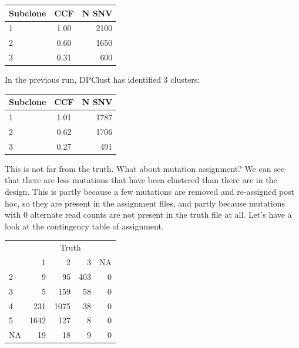 \documentclass[]{article}
\newenvironment{Shaded}{\begin{snugshade}}{\end{snugshade}}
\newcommand{\DataTypeTok}[1]{\textcolor[rgb]{0.13,0.29,0.53}{#1}}
\newcommand{\DecValTok}[1]{\textcolor[rgb]{0.00,0.00,0.81}{#1}}
\newcommand{\KeywordTok}[1]{\textcolor[rgb]{0.13,0.29,0.53}{\textbf{#1}}}
\newcommand{\NormalTok}[1]{#1}
\newcommand{\OperatorTok}[1]{\textcolor[rgb]{0.81,0.36,0.00}{\textbf{#1}}}
\newcommand{\StringTok}[1]{\textcolor[rgb]{0.31,0.60,0.02}{#1}}
\begin{document}
\begin{longtable}[]{@{}lcr@{}}
\toprule
Subclone & CCF & N SNV\tabularnewline
\midrule
\endhead
1 & 1.00 & 2100\tabularnewline
2 & 0.60 & 1650\tabularnewline
3 & 0.31 & 600\tabularnewline
\bottomrule
\end{longtable}

In the previous run, DPClust has identified 3 clusters:

\begin{longtable}[]{@{}lcr@{}}
\toprule
Subclone & CCF & N SNV\tabularnewline
\midrule
\endhead
1 & 1.01 & 1787\tabularnewline
2 & 0.62 & 1706\tabularnewline
3 & 0.27 & 491\tabularnewline
\bottomrule
\end{longtable}

This is not far from the truth. What about mutation assignment? We can
see that there are less mutations that have been clustered than there
are in the design. This is partly because a few mutations are removed
and re-assigned post hoc, so they are present in the assignment files,
and partly because mutations with 0 alternate read counts are not
present in the truth file at all. Let's have a look at the contingency
table of assignment.

\begin{Shaded}
\end{Shaded}

\begin{table}[H]
\centering
\begin{tabular}{lrrrr}
\toprule
\multicolumn{1}{c}{} & \multicolumn{4}{c}{Truth} \\
\cmidrule(l{3pt}r{3pt}){2-5}
  & 1 & 2 & 3 & NA\\
\midrule
2 & 9 & 95 & 403 & 0\\
3 & 5 & 159 & 58 & 0\\
4 & 231 & 1075 & 38 & 0\\
5 & 1642 & 127 & 8 & 0\\
NA & 19 & 18 & 9 & 0\\
\bottomrule
\end{tabular}
\end{table}
\end{document}
